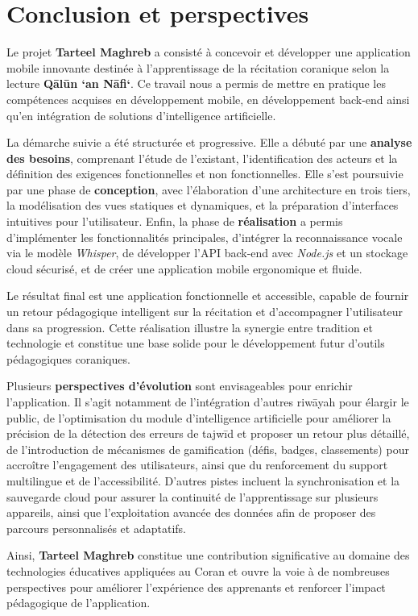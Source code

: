 \chapter*{Conclusion et perspectives}
\label{sec:conclusion}

Le projet \textbf{Tarteel Maghreb} a consisté à concevoir et développer une application mobile innovante destinée à l’apprentissage de la récitation coranique selon la lecture \textbf{Qālūn ‘an Nāfi‘}. Ce travail nous a permis de mettre en pratique les compétences acquises en développement mobile, en développement back-end ainsi qu’en intégration de solutions d’intelligence artificielle. \vspace{2mm}

La démarche suivie a été structurée et progressive. Elle a débuté par une \textbf{analyse des besoins}, comprenant l’étude de l’existant, l’identification des acteurs et la définition des exigences fonctionnelles et non fonctionnelles. Elle s’est poursuivie par une phase de \textbf{conception}, avec l’élaboration d’une architecture en trois tiers, la modélisation des vues statiques et dynamiques, et la préparation d’interfaces intuitives pour l’utilisateur. Enfin, la phase de \textbf{réalisation} a permis d’implémenter les fonctionnalités principales, d’intégrer la reconnaissance vocale via le modèle \textit{Whisper}, de développer l’API back-end avec \textit{Node.js} et un stockage cloud sécurisé, et de créer une application mobile ergonomique et fluide. 
\vspace{2mm}

Le résultat final est une application fonctionnelle et accessible, capable de fournir un retour pédagogique intelligent sur la récitation et d’accompagner l’utilisateur dans sa progression. Cette réalisation illustre la synergie entre tradition et technologie et constitue une base solide pour le développement futur d’outils pédagogiques coraniques.\vspace{2mm}

Plusieurs \textbf{perspectives d’évolution} sont envisageables pour enrichir l’application. Il s’agit notamment de l’intégration d’autres riwāyah pour élargir le public, de l’optimisation du module d’intelligence artificielle pour améliorer la précision de la détection des erreurs de tajwīd et proposer un retour plus détaillé, de l’introduction de mécanismes de gamification (défis, badges, classements) pour accroître l’engagement des utilisateurs, ainsi que du renforcement du support multilingue et de l’accessibilité. D’autres pistes incluent la synchronisation et la sauvegarde cloud pour assurer la continuité de l’apprentissage sur plusieurs appareils, ainsi que l’exploitation avancée des données afin de proposer des parcours personnalisés et adaptatifs.\vspace{2mm} 

Ainsi, \textbf{Tarteel Maghreb} constitue une contribution significative au domaine des technologies éducatives appliquées au Coran et ouvre la voie à de nombreuses perspectives pour améliorer l’expérience des apprenants et renforcer l’impact pédagogique de l’application.
